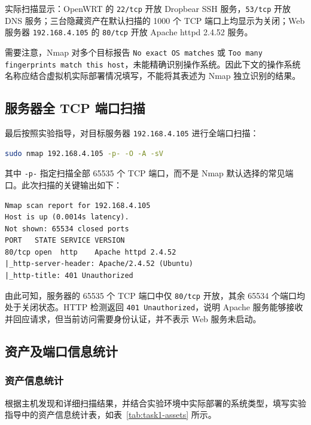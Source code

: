 实际扫描显示：OpenWRT 的 \texttt{22/tcp} 开放 Dropbear SSH 服务，\texttt{53/tcp} 开放 DNS 服务；三台隐藏资产在默认扫描的 1000 个 TCP 端口上均显示为关闭；Web 服务器 \texttt{192.168.4.105} 的 \texttt{80/tcp} 开放 Apache httpd 2.4.52 服务。

需要注意，Nmap 对多个目标报告 \texttt{No exact OS matches} 或 \texttt{Too many fingerprints match this host}，未能精确识别操作系统。因此下文的操作系统名称应结合虚拟机实际部署情况填写，不能将其表述为 Nmap 独立识别的结果。

\subsection{服务器全 TCP 端口扫描}

最后按照实验指导，对目标服务器 \texttt{192.168.4.105} 进行全端口扫描：

\begin{lstlisting}[language=bash,caption={服务器 65535 个 TCP 端口扫描}]
sudo nmap 192.168.4.105 -p- -O -A -sV
\end{lstlisting}

其中 \texttt{-p-} 指定扫描全部 65535 个 TCP 端口，而不是 Nmap 默认选择的常见端口。此次扫描的关键输出如下：

\begin{lstlisting}[caption={服务器全端口扫描的实际关键输出}]
Nmap scan report for 192.168.4.105
Host is up (0.0014s latency).
Not shown: 65534 closed ports
PORT   STATE SERVICE VERSION
80/tcp open  http    Apache httpd 2.4.52
|_http-server-header: Apache/2.4.52 (Ubuntu)
|_http-title: 401 Unauthorized
\end{lstlisting}

由此可知，服务器的 65535 个 TCP 端口中仅 \texttt{80/tcp} 开放，其余 65534 个端口均处于关闭状态。HTTP 检测返回 \texttt{401 Unauthorized}，说明 Apache 服务能够接收并回应请求，但当前访问需要身份认证，并不表示 Web 服务未启动。

\subsection{资产及端口信息统计}

\subsubsection{资产信息统计}

根据主机发现和详细扫描结果，并结合实验环境中实际部署的系统类型，填写实验指导中的资产信息统计表，如表~\ref{tab:task1-assets} 所示。

